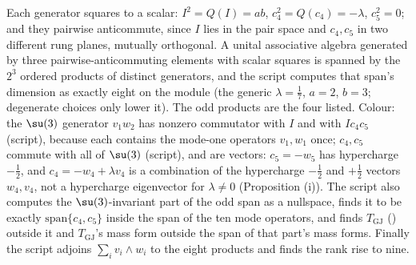 Each generator squares to a scalar: $I^{2} = Q(I) = ab$, $c_{4}^{2} = Q(c_{4}) = -\lambda$, $c_{5}^{2} = 0$; and they pairwise anticommute, since $I$ lies in the pair space and $c_{4}, c_{5}$ in two different rung planes, mutually orthogonal. A unital associative algebra generated by three pairwise-anticommuting elements with scalar squares is spanned by the $2^{3}$ ordered products of distinct generators, and the script computes that span's dimension as exactly eight on the module (the generic $\lambda = \tfrac17$, $a = 2$, $b = 3$; degenerate choices only lower it). The odd products are the four listed. Colour: the $\su(3)$ generator $v_{1}w_{2}$ has nonzero commutator with $I$ and with $Ic_{4}c_{5}$ (script), because each contains the mode-one operators $v_{1}, w_{1}$ once; $c_{4}, c_{5}$ commute with all of $\su(3)$ (script), and are vectors: $c_{5} = -w_{5}$ has hypercharge $-\tfrac12$, and $c_{4} = -w_{4} + \lambda v_{4}$ is a combination of the hypercharge $-\tfrac12$ and $+\tfrac12$ vectors $w_{4}, v_{4}$, not a hypercharge eigenvector for $\lambda \ne 0$ (Proposition (i)). The script also computes the $\su(3)$-invariant part of the odd span as a nullspace, finds it to be exactly $\mathrm{span}\{c_{4}, c_{5}\}$ inside the span of the ten mode operators, and finds $T_{\mathrm{GJ}}$ () outside it and $T_{\mathrm{GJ}}$'s mass form outside the span of that part's mass forms. Finally the script adjoins $\sum_{i}v_{i}\wedge w_{i}$ to the eight products and finds the rank rise to nine.
